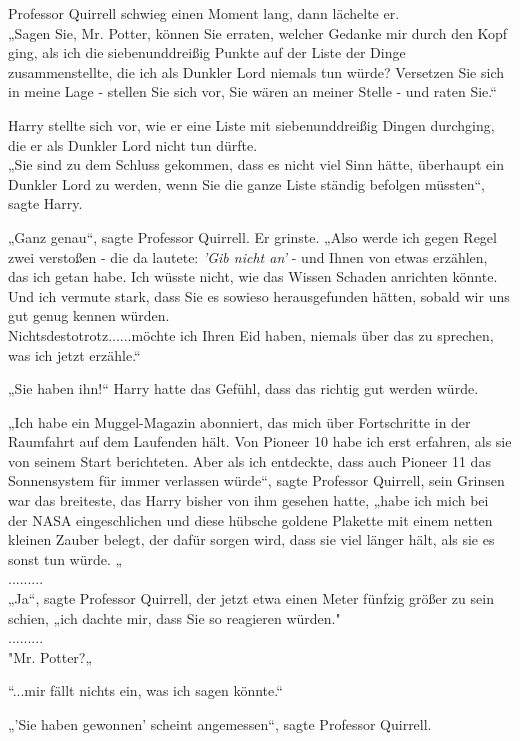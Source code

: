 {Professor Quirrell schwieg einen Moment lang, dann lächelte er.\\ „Sagen Sie, Mr. Potter, können Sie erraten, welcher Gedanke mir durch den Kopf ging, als ich die siebenunddreißig Punkte auf der Liste der Dinge zusammenstellte, die ich als Dunkler Lord niemals tun würde? Versetzen Sie sich in meine Lage - stellen Sie sich vor, Sie wären an meiner Stelle - und raten Sie.“

Harry stellte sich vor, wie er eine Liste mit siebenunddreißig Dingen durchging, die er als Dunkler Lord nicht tun dürfte.\\ „Sie sind zu dem Schluss gekommen, dass es nicht viel Sinn hätte, überhaupt ein Dunkler Lord zu werden, wenn Sie die ganze Liste ständig befolgen müssten“, sagte Harry.

„Ganz genau“, sagte Professor Quirrell. Er grinste. „Also werde ich gegen Regel zwei verstoßen - die da lautete: \emph{'Gib nicht an'} - und Ihnen von etwas erzählen, das ich getan habe. Ich wüsste nicht, wie das Wissen Schaden anrichten könnte. Und ich vermute stark, dass Sie es sowieso herausgefunden hätten, sobald wir uns gut genug kennen würden.\\ Nichtsdestotrotz......möchte ich Ihren Eid haben, niemals über das zu sprechen, was ich jetzt erzähle.“

„Sie haben ihn!“ Harry hatte das Gefühl, dass das richtig gut werden würde.

„Ich habe ein Muggel-Magazin abonniert, das mich über Fortschritte in der Raumfahrt auf dem Laufenden hält. Von Pioneer 10 habe ich erst erfahren, als sie von seinem Start berichteten. Aber als ich entdeckte, dass auch Pioneer 11 das Sonnensystem für immer verlassen würde“, sagte Professor Quirrell, sein Grinsen war das breiteste, das Harry bisher von ihm gesehen hatte, „habe ich mich bei der NASA eingeschlichen und diese hübsche goldene Plakette mit einem netten kleinen Zauber belegt, der dafür sorgen wird, dass sie viel länger hält, als sie es sonst tun würde. „\\ .........\\ „Ja“, sagte Professor Quirrell, der jetzt etwa einen Meter fünfzig größer zu sein schien, „ich dachte mir, dass Sie so reagieren würden."\\ .........\\ "Mr. Potter?„

“...mir fällt nichts ein, was ich sagen könnte.“

„'Sie haben gewonnen' scheint angemessen“, sagte Professor Quirrell.

}
